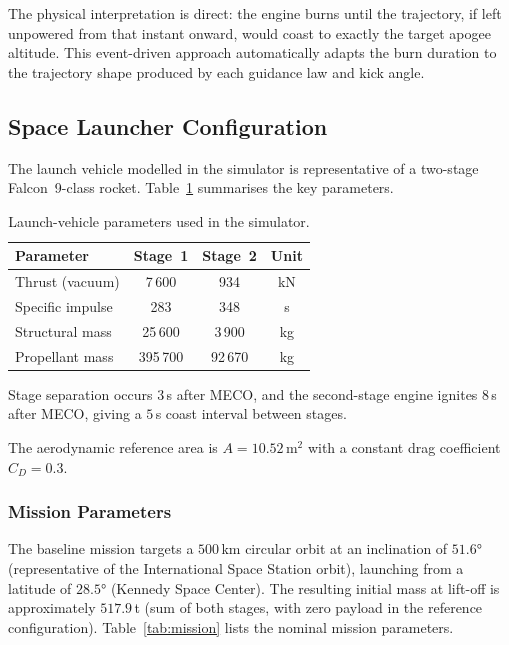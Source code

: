 The physical interpretation is direct: the engine burns until the trajectory,
if left unpowered from that instant onward, would coast to exactly the target
apogee altitude.  This event-driven approach automatically adapts the burn
duration to the trajectory shape produced by each guidance law and kick angle.

\subsection{Space Launcher Configuration}
\label{ssec:launcher}

The launch vehicle modelled in the simulator is representative of a
two-stage Falcon~9-class rocket.  Table~\ref{tab:launcher} summarises
the key parameters.

\begin{table}[htbp]
  \centering
  \caption{Launch-vehicle parameters used in the simulator.}
  \label{tab:launcher}
  \begin{tabular}{l c c c}
    \toprule
    \textbf{Parameter} & \textbf{Stage~1} & \textbf{Stage~2} & \textbf{Unit} \\
    \midrule
    Thrust (vacuum)       & 7\,600  & 934    & kN   \\
    Specific impulse      & 283     & 348    & s    \\
    Structural mass       & 25\,600 & 3\,900 & kg   \\
    Propellant mass       & 395\,700& 92\,670& kg   \\
    \bottomrule
  \end{tabular}
\end{table}

Stage separation occurs $3$\,s after MECO, and the second-stage engine ignites
$8$\,s after MECO, giving a $5$\,s coast interval between stages.

The aerodynamic reference area is $A = 10.52$\,m$^2$ with a constant drag
coefficient $C_D = 0.3$.

\subsubsection{Mission Parameters}

The baseline mission targets a $500$\,km circular orbit at an inclination of
$51.6°$ (representative of the International Space Station orbit), launching
from a latitude of $28.5°$ (Kennedy Space Center).  The resulting initial mass
at lift-off is approximately $517.9$\,t (sum of both stages, with zero payload
in the reference configuration).  Table~\ref{tab:mission} lists the nominal
mission parameters.


